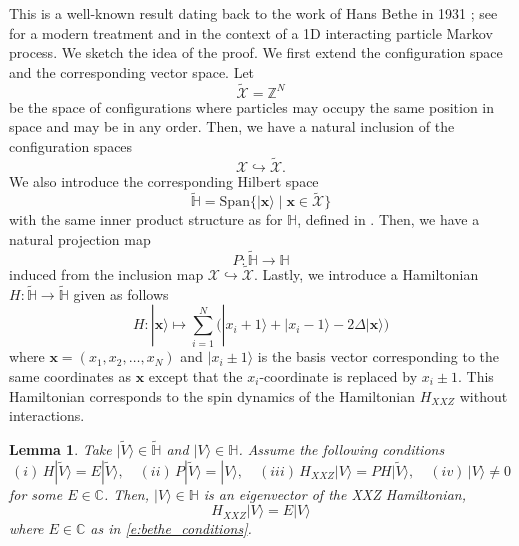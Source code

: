 \documentclass[a4paper,11pt]{article}
\newtheorem{lemma}[theorem]{Lemma}
\theoremstyle{definition}
\begin{document}
This is a well-known result dating back to the work of Hans Bethe in 1931 \cite{bethe_zur_1931}; see \cite{caux_bethe_2014} for a modern treatment and \cite{gwa_bethe_1992} in the context of a 1D interacting particle Markov process. We sketch the idea of the proof. We first extend the configuration space and the corresponding vector space. Let
\begin{equation}
    \tilde{\mathcal{X}} = \mathbb{Z}^{N}
\end{equation}
be the space of configurations where particles may occupy the same position in space and may be in any order. Then, we have a natural inclusion of the configuration spaces
\begin{equation}
    \mathcal{X} \hookrightarrow \tilde{\mathcal{X}}.
\end{equation}
We also introduce the corresponding Hilbert space
\begin{equation}
    \tilde{\mathbb{H}} = \mathrm{Span} \{|\mathbf{x} \rangle \mid \mathbf{x} \in \tilde{\mathcal{X}} \}
\end{equation}
with the same inner product structure as for $\mathbb{H}$, defined in . Then, we have a natural projection map
\begin{equation}
    P: \tilde{\mathbb{H}} \rightarrow \mathbb{H}
\end{equation}
induced from the inclusion map $\mathcal{X} \hookrightarrow \tilde{\mathcal{X}}$. Lastly, we introduce a Hamiltonian $H: \tilde{\mathbb{H}} \rightarrow \tilde{\mathbb{H}}$ given as follows
\begin{equation}
    H: |\mathbf{x} \rangle \mapsto \sum_{i =1}^N \bigg(| x_i +1\rangle + | x_i -1 \rangle - 2 \Delta |\mathbf{x} \rangle\bigg)
\end{equation}
where $\mathbf{x}= (x_1, x_2, \dots, x_N)$ and $|x_i \pm 1 \rangle$ is the basis vector corresponding to the same coordinates as $\mathbf{x}$ except that the $x_i$-coordinate is replaced by $x_i \pm 1$. This Hamiltonian corresponds to the spin dynamics of the Hamiltonian $H_{XXZ}$ without interactions. 


\begin{lemma}\label{l:bethe_conditions}
Take $|\tilde{V} \rangle \in \tilde{\mathbb{H}}$ and $|V \rangle \in \mathbb{H}$. Assume the following conditions
\begin{equation}\label{e:bethe_conditions}
    (i)\, H |\tilde{V} \rangle = E |\tilde{V} \rangle, \quad (ii)\, P |\tilde{V} \rangle = |V \rangle, \quad (iii)\, H_{XXZ} | V \rangle = P H | \tilde{V} \rangle , \quad (iv)\, | V\rangle \neq 0
\end{equation}
for some $E\in \mathbb{C}$. Then, $|V \rangle \in \mathbb{H}$ is an eigenvector of the XXZ Hamiltonian,
\begin{equation}
    H_{XXZ} |V\rangle = E | V \rangle
\end{equation}
where $E \in \mathbb{C}$ as in \eqref{e:bethe_conditions}.
\end{lemma}
\end{document}
